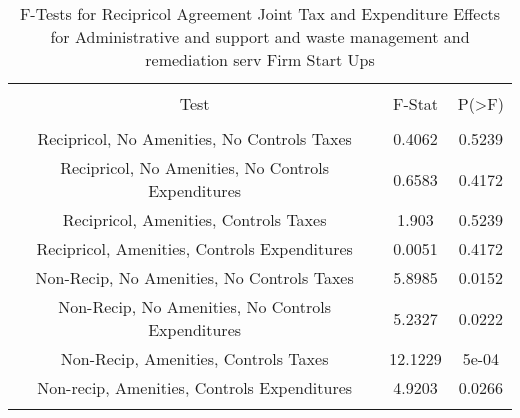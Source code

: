
\begin{table}[!htbp] \centering 
  \caption{F-Tests for Recipricol Agreement Joint Tax and Expenditure Effects for Administrative and support and waste management and remediation serv Firm Start Ups} 
  \label{56Ftests} 
\begin{tabular}{@{\extracolsep{5pt}} ccc} 
\\[-1.8ex]\hline 
\hline \\[-1.8ex] 
Test & F-Stat & P(\textgreater F) \\ 
\hline \\[-1.8ex] 
Recipricol, No Amenities, No Controls Taxes & 0.4062 & 0.5239 \\ 
Recipricol, No Amenities, No Controls Expenditures & 0.6583 & 0.4172 \\ 
Recipricol, Amenities, Controls Taxes & 1.903 & 0.5239 \\ 
Recipricol, Amenities, Controls Expenditures & 0.0051 & 0.4172 \\ 
Non-Recip, No Amenities, No Controls Taxes & 5.8985 & 0.0152 \\ 
Non-Recip, No Amenities, No Controls Expenditures & 5.2327 & 0.0222 \\ 
Non-Recip, Amenities, Controls Taxes & 12.1229 & 5e-04 \\ 
Non-recip, Amenities, Controls Expenditures & 4.9203 & 0.0266 \\ 
\hline \\[-1.8ex] 
\end{tabular} 
\end{table} 
